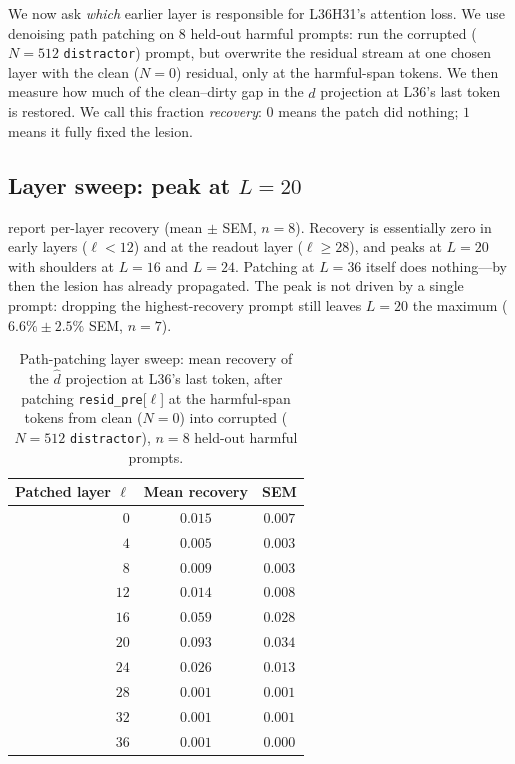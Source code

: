\documentclass[10pt,twocolumn]{article}
\newcommand{\layerL}{\ell}
\newcommand{\Ncontext}{N}
\theoremstyle{definition}
\begin{document}
We now ask \emph{which} earlier layer is responsible for L36H31's
attention loss. We use denoising path patching
\citep{goldowskydill2023patching} on $8$ held-out harmful prompts:
run the corrupted ($\Ncontext{=}512$ \texttt{distractor}) prompt, but
overwrite the residual stream at one chosen layer with the clean
($\Ncontext{=}0$) residual, only at the harmful-span tokens. We then
measure how much of the clean--dirty gap in the $\hat d$ projection at
L36's last token is restored. We call this fraction \emph{recovery}:
$0$ means the patch did nothing; $1$ means it fully fixed the lesion.

\subsection{Layer sweep: peak at $L=20$}

 report per-layer recovery (mean
$\pm$ SEM, $n{=}8$). Recovery is essentially zero in early layers
($\layerL{<}12$) and at the readout layer ($\layerL{\geq}28$), and
peaks at \textbf{$L=20$} with shoulders at $L=16$ and $L=24$. Patching at
$L=36$ itself does nothing---by then the lesion has already
propagated. The peak is not driven by a single prompt: dropping the
highest-recovery prompt still leaves $L=20$ the maximum
($6.6\% \pm 2.5\%$ SEM, $n{=}7$).

\begin{table}[t]
\centering\small
\begin{tabular}{rcc}
\toprule
Patched layer $\layerL$ & Mean recovery & SEM \\
\midrule
$0$            & $0.015$       & $0.007$ \\
$4$            & $0.005$       & $0.003$ \\
$8$            & $0.009$       & $0.003$ \\
$12$           & $0.014$       & $0.008$ \\
$16$           & $0.059$       & $0.028$ \\
\textbf{$20$}  & $\bm{0.093}$  & $\bm{0.034}$ \\
$24$           & $0.026$       & $0.013$ \\
$28$           & $0.001$       & $0.001$ \\
$32$           & $0.001$       & $0.001$ \\
$36$           & $0.001$       & $0.000$ \\
\bottomrule
\end{tabular}
\caption{Path-patching layer sweep: mean recovery of the
$\hat d$ projection at L36's last token, after patching
\texttt{resid\_pre}[$\layerL$] at the harmful-span tokens from
clean ($\Ncontext{=}0$) into corrupted ($\Ncontext{=}512$
\texttt{distractor}), $n{=}8$ held-out harmful prompts.}
\label{tab:pp-layer}
\end{table}
\end{document}
